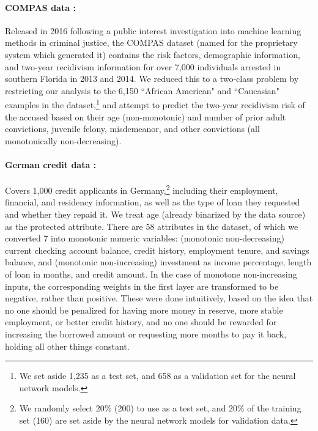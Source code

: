         \paragraph{COMPAS data \cite{larson2016we}:} 
            Released in 2016 following a public interest investigation into machine learning methods in criminal justice, the COMPAS dataset (named for the proprietary system which generated it) contains the risk factors, demographic information, and two-year recidivism information for over 7,000 individuals arrested in southern Florida in 2013 and 2014.  We reduced this to a two-class problem by restricting our analysis to the 6,150  ``African American" and ``Caucasian" examples in the dataset,\footnote{We set aside 1,235 as a test set, and 658 as a validation set for the neural network models.} and attempt to predict the two-year recidivism risk of the accused based on their age (non-monotonic) and number of prior adult convictions, juvenile felony, misdemeanor, and other convictions (all monotonically non-decreasing).
        
        \paragraph{German credit data \cite{ucigerman}:} 
            Covers 1,000 credit applicants in Germany,\footnote{We randomly select 20\% (200) to use as a test set, and 20\% of the training set (160) are set aside by the neural network models for validation data.} including their employment, financial, and residency information, as well as the type of loan they requested and whether they repaid it.  We treat age (already binarized by the data source) as the protected attribute. There are 58 attributes in the dataset, of which we converted 7 into monotonic numeric variables: (monotonic non-decreasing) current checking account balance, credit history, employment tenure, and savings balance, and (monotonic non-increasing) investment as income percentage, length of loan in months, and credit amount. In the case of monotone non-increasing inputs, the corresponding weights in the first layer are transformed to be negative, rather than positive.   These were done intuitively, based on the idea that no one should be penalized for having more money in reserve, more stable employment, or better credit history, and no one should be rewarded for increasing the borrowed amount or requesting more months to pay it back, holding all other things constant.

